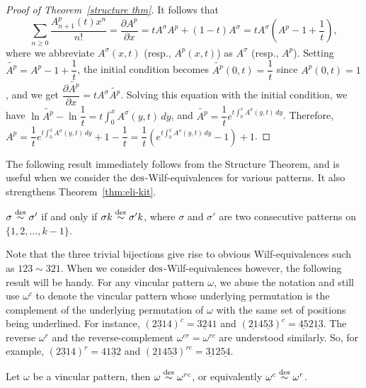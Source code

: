 \begin{proof}[Proof of Theorem~\ref{structure thm}]
    It follows that $$\sum_{n\ge 0}\frac{A_{n+1}^p(t)x^n}{n!}=\frac{{\partial A^p}}{\partial x}=tA^{\sigma}A^p+(1-t)A^{\sigma}=tA^{\sigma}\left(A^p-1+\frac{1}{t}\right),$$
    where we abbreviate $A^{\sigma}(x,t)$ (resp., $A^p(x,t)$) as $A^{\sigma}$ (resp., $A^p$).
    Setting $\widetilde{A^p}=A^{p}-1+\dfrac{1}{t}$, the initial condition becomes $\widetilde{A^p}(0,t)=\dfrac{1}{t}$ since $A^p(0,t)=1$, and 
    we get $\dfrac{\partial \widetilde{A^p}}{\partial x}=tA^{\sigma}\widetilde{A^p}.$
    Solving this equation with the initial condition, we have 
    $\ln \widetilde{A^p}-\ln \dfrac{1}{t}=t \int_{0}^{x} A^{\sigma}(y,t) \,dy$, and 
    $\widetilde{A^p} = \dfrac{1}{t} e^{t \int_{0}^{x} A^{\sigma}(y,t) \,dy}$.
    Therefore, $A^p = \dfrac{1}{t} e^{t \int_{0}^{x} A^{\sigma}(y,t) \,dy} +1-\dfrac{1}{t}=\dfrac{1}{t} (e^{t \int_{0}^{x} A^{\sigma}(y,t) \,dy}-1) +1$.
\end{proof}

The following result immediately follows from the Structure Theorem, and is useful when we consider the $\mathrm{des}$-Wilf-equivalences for various patterns. It also strengthens Theorem~\ref{thm:eli-kit}.

\begin{corollary}\label{col:structure}
    $\sigma\overset{\mathrm{des}}{\sim}\sigma'$ if and only if $\sigma k\overset{\mathrm{des}}{\sim}\sigma' k$, where $\sigma$ and $\sigma'$ are two consecutive patterns on $\{1,2,\ldots,k-1\}$.
\end{corollary}

Note that the three trivial bijections give rise to obvious Wilf-equivalences such as $123\sim 321$. When we consider $\mathrm{des}$-Wilf-equivalences however, the following result will be handy. For any vincular pattern $\omega$, we abuse the notation and still use $\omega^c$ to denote the vincular pattern whose underlying permutation is the complement of the underlying permutation of $\omega$ with the same set of positions being underlined. For instance, $(\underline{231}4 )^c=\underline{324}1$ and $(\underline{21}4\underline{53})^c=\underline{45}2\underline{13}$. The reverse $\omega^r$ and the reverse-complement $\omega^{cr}=\omega^{rc}$ are understood similarly. So, for example,  $(\underline{231}4 )^r=4\underline{132}$ and $(\underline{21}4\underline{53})^{rc}=\underline{31}2\underline{54}$.

\begin{proposition} \label{omega--omega^rc}
    Let $\omega$ be a vincular pattern, then $\omega \overset{\mathrm{des}}{\sim} \omega^{rc}$, or equivalently $\omega^c \overset{\mathrm{des}}{\sim} \omega^{r}$.
\end{proposition}


